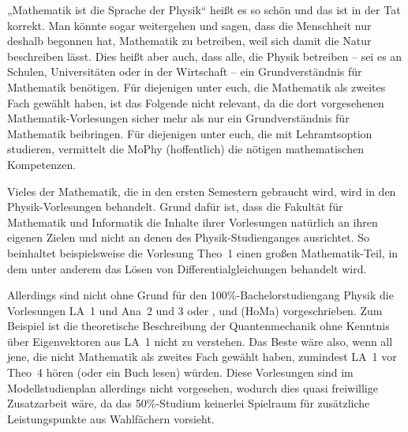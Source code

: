 „Mathematik ist die Sprache der Physik“ heißt es so schön und das ist in der Tat korrekt. Man könnte sogar weitergehen und sagen, dass die Menschheit nur deshalb begonnen hat, Mathematik zu betreiben, weil sich damit die Natur beschreiben lässt. Dies heißt aber auch, dass alle, die Physik betreiben -- sei es an Schulen, Universitäten oder in der Wirtschaft -- ein Grundverständnis für Mathematik benötigen. Für diejenigen unter euch, die Mathematik als zweites Fach gewählt haben, ist das Folgende nicht relevant, da die dort vorgesehenen Mathematik-Vorlesungen sicher mehr als nur ein Grundverständnis für Mathematik beibringen. Für diejenigen unter euch, die mit Lehramtsoption studieren, vermittelt die MoPhy (hoffentlich) die nötigen mathematischen Kompetenzen.

Vieles der Mathematik, die in den ersten Semestern gebraucht wird, wird in den Physik-Vorlesungen behandelt. Grund dafür ist, dass die Fakultät für Mathematik und Informatik die Inhalte ihrer Vorlesungen natürlich an ihren eigenen Zielen und nicht an denen des Physik-Studienganges ausrichtet. So beinhaltet beispielsweise die Vorlesung \gls{Theo}~1 einen großen Mathematik-Teil, in dem unter anderem das Lösen von Differentialgleichungen behandelt wird.

Allerdings sind nicht ohne Grund für den 100\%-Bachelorstudiengang Physik die Vorlesungen \gls{LA}~1 und \gls{Ana}~2 und 3 oder ,  und  (\gls{HoMa}) vorgeschrieben. Zum Beispiel ist die theoretische Beschreibung der Quantenmechanik ohne Kenntnis über Eigenvektoren aus \gls{LA}~1 nicht zu verstehen. Das Beste wäre also, wenn all jene, die nicht Mathematik als zweites Fach gewählt haben, zumindest \gls{LA}~1 vor \gls{Theo}~4 hören (oder ein Buch lesen) würden. Diese Vorlesungen sind im Modellstudienplan allerdings nicht vorgesehen, wodurch dies quasi freiwillige Zusatzarbeit wäre, da das 50\%-Studium keinerlei Spielraum für zusätzliche Leistungspunkte aus Wahlfächern vorsieht.
